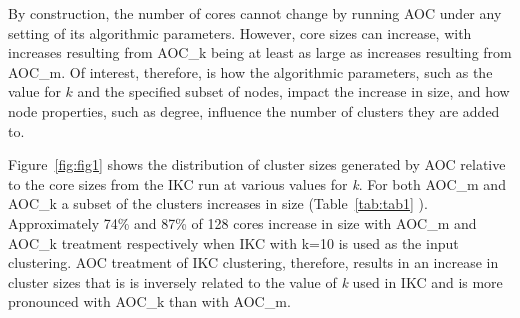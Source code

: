 \documentclass[12pt, oneside]{article}   	%
\begin{document}
	By construction, the number of cores cannot change by running AOC  under any setting of its algorithmic parameters. However, core sizes can increase, with increases resulting from AOC\_k being at least as large as increases resulting from AOC\_m.
	Of interest, therefore, is how the algorithmic parameters, such as the value for $k$ and the specified subset of nodes, impact the increase in size, and how node properties, such as degree, influence the number of clusters they are added to.
	
	Figure~\ref{fig:fig1} shows the distribution of cluster sizes generated by AOC relative to the core sizes from the IKC run at various values for \emph{k}. For both AOC\_m and AOC\_k a subset of the clusters increases in size (Table~\ref{tab:tab1} ).
	Approximately 74\% and 87\% of  128 cores increase in size with AOC\_m and AOC\_k treatment respectively when IKC with k=10 is used as the input clustering. AOC treatment of IKC clustering, therefore, results in an increase in cluster sizes that is is inversely related to the value of \emph{k} used in IKC and is more pronounced with AOC\_k than with AOC\_m. 
	
\end{document}

